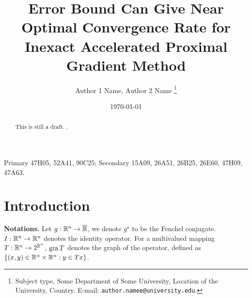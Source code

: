 \documentclass[12pt]{article}
\title{{
    \fontfamily{ptm}\selectfont 
    Error Bound Can Give Near Optimal Convergence Rate for Inexact Accelerated Proximal Gradient Method
    }
}
\author{
    Author 1 Name, Author 2 Name
    \thanks{
        Subject type, Some Department of Some University, Location of the University,
        Country. E-mail: \texttt{author.namee@university.edu}.
    }
}
\begin{document}
\date{\today}
\maketitle
{}
\begin{abstract} 
    \noindent
    This is still a draft. \cite{zhang_robust_2022}. 
\end{abstract}
Primary 47H05, 52A41, 90C25; Secondary 15A09, 26A51, 26B25, 26E60, 47H09, 47A63.

\section{Introduction}
    \textbf{Notations.}
    Let $g: \mathbb R^n \rightarrow\overline {\mathbb R}$, we denote $g^\star$ to be the Fenchel conjugate. 
    $I: \mathbb R^n \rightarrow \mathbb R^n$ denotes the identity operator.
    For a multivalued mapping $T: \mathbb R^n \rightarrow 2^{\mathbb R^n}$, $\operatorname{gra} T$ denotes the graph of the operator, defined as $\{(x, y)\in \mathbb R^n \times \mathbb R^n : y \in Tx\}$. 
\end{document}

